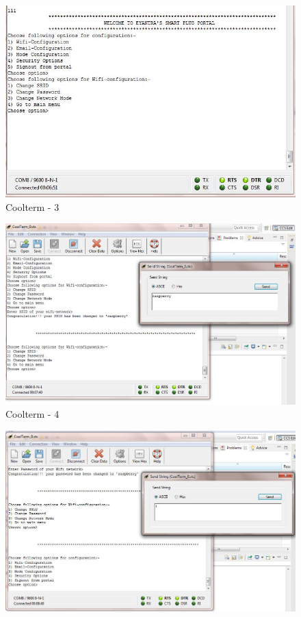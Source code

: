 \documentclass[a4paper,12pt,oneside]{book}
\begin{document}
\begin{itemize}
\begin{figure}[H]
		\includegraphics[width=13cm]{coolterm3.jpg}
		\caption{Coolterm - 3}
		\label{30}
	\end{figure}
	\begin{figure}[H]  \centering
		\includegraphics[width=13cm]{coolterm4.jpg}
		\caption{Coolterm - 4}
		\label{31}
	\end{figure}
	\begin{figure}[H]  \centering
		\includegraphics[width=13cm]{coolterm5.jpg}

\end{figure}
\end{itemize}
\end{document}
